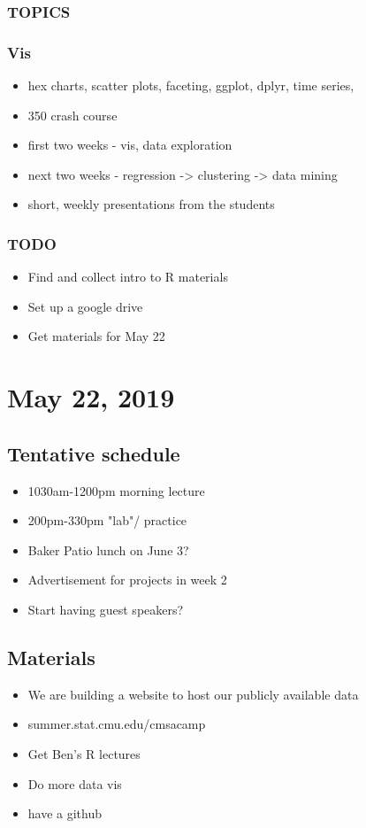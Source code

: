 \documentclass{article}
\begin{document}
\subsubsection{TOPICS}
\label{sec:org271b8af}
\subsubsection{Vis}
\label{sec:orgfc2161c}
\begin{itemize}
\item hex charts, scatter plots, faceting, ggplot, dplyr, time series,
\item 350 crash course
\item first two weeks - vis, data exploration
\item next two weeks - regression -> clustering -> data mining
\item short, weekly presentations from the students
\end{itemize}
\subsubsection{{\bfseries\sffamily TODO} }
\label{sec:orgdbcab21}
\begin{itemize}
\item Find and collect intro to R materials
\item Set up a google drive
\item Get materials for May 22
\end{itemize}
\section{May 22, 2019}
\label{sec:org19eab32}
\subsection{Tentative schedule}
\label{sec:orge3a1658}
\begin{itemize}
\item 1030am-1200pm morning lecture
\item 200pm-330pm "lab"/ practice
\item Baker Patio lunch on June 3?
\item Advertisement for projects in week 2
\item Start having guest speakers?
\end{itemize}
\subsection{Materials}
\label{sec:org9ab25b9}
\begin{itemize}
\item We are building a website to host our publicly available data
\item summer.stat.cmu.edu/cmsacamp
\item Get Ben's R lectures
\item Do more data vis
\item have a github
\end{itemize}
\end{document}
